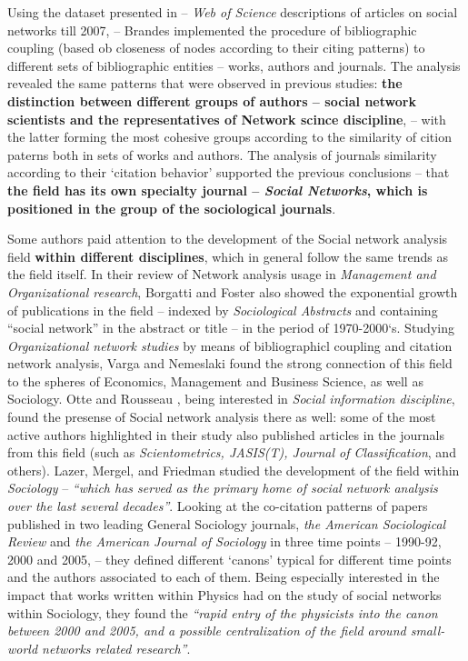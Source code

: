 \documentclass[11pt]{article} %
\newcommand{\Remark}[1]{\ifodd\value{page} \normalmarginpar
 \else \reversemarginpar \fi \marginpar{{\footnotesize #1}} }
\begin{document}
Using the dataset presented in \citep{Understand} -- \textit{Web of Science} descriptions of articles on social networks till 2007, \Remark{URL} -- Brandes \citep{brandes} implemented the procedure of bibliographic coupling (based ob closeness of nodes according to their citing patterns) to different sets of bibliographic entities -- works, authors and journals. The analysis revealed the same patterns that were observed in previous studies: \textbf{the distinction between different groups of authors -- social network scientists and the representatives of Network scince discipline}, -- with the latter forming the most cohesive groups according to the similarity of cition paterns both in sets of works and authors. The analysis of journals similarity according to their `citation behavior' supported the previous conclusions\citep{normSci, leydes} -- that \textbf{the field has its own specialty journal -- \textit{Social Networks}, which is positioned in the group of the sociological journals}.\medskip  

Some authors paid attention to the development of the Social network analysis field \textbf{within different disciplines}, which in general follow the same trends as the field itself. In their review of Network analysis usage in \textit{Management and Organizational research}, Borgatti and Foster \citep{borgatti} also showed the exponential growth of publications in the field -- indexed by \textit{Sociological Abstracts} and containing “social network” in the abstract or title -- in the period of 1970-2000`s. Studying \textit{Organizational network studies} by means of bibliographicl coupling and citation network analysis, Varga and Nemeslaki \citep{varga} found the strong connection of this field to the spheres of Economics, Management and Business Science, as well as Sociology. Otte and Rousseau \citep{SNAinf}, being interested in \textit{Social information discipline}, found the presense of Social network analysis there as well: some of the most active authors highlighted in their study also published articles in the journals from this field (such as \textit{Scientometrics, JASIS(T), Journal of Classification}, and others). Lazer, Mergel, and Friedman \citep{lazer} studied the development of the field within \textit{Sociology} -- \textit{``which has served as the primary home of social network analysis over the last several decades''}. Looking at the co-citation patterns of papers published in two leading General Sociology journals, \textit{the American Sociological Review} and \textit{the American Journal of Sociology} in three time points -- 1990-92, 2000 and 2005, -- they defined different `canons' typical for different time points and the authors associated to each of them. Being especially interested in the impact that works written within Physics had on the study of social networks within Sociology, they found the \textit{``rapid entry of the physicists into the canon between 2000 and 2005, and a possible centralization of the field around small-world networks related research''}.\medskip  
\end{document}
